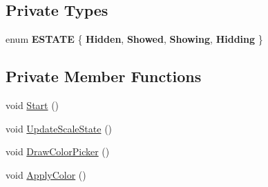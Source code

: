 \subsection*{Private Types}
\begin{DoxyCompactItemize}
\item 
\mbox{\label{class_color_picker_controller_a2e22c8fc7d34083434108a065b4c4ada}} 
enum {\bfseries E\+S\+T\+A\+TE} \{ {\bfseries Hidden}, 
{\bfseries Showed}, 
{\bfseries Showing}, 
{\bfseries Hidding}
 \}
\end{DoxyCompactItemize}
\subsection*{Private Member Functions}
\begin{DoxyCompactItemize}
\item 
void \mbox{\hyperlink{class_color_picker_controller_a8d00cbf7e1b2a60f601ab514bf1bbe75}{Start}} ()
\item 
void \mbox{\hyperlink{class_color_picker_controller_a2e9977639f4aeb80cccd6fd972ec8044}{Update\+Scale\+State}} ()
\item 
void \mbox{\hyperlink{class_color_picker_controller_a0bb93373e9344a86476119ae7f98c6cb}{Draw\+Color\+Picker}} ()
\item 
void \mbox{\hyperlink{class_color_picker_controller_af1be2fecab7ca749e1862a9a61c46401}{Apply\+Color}} ()
\end{DoxyCompactItemize}
